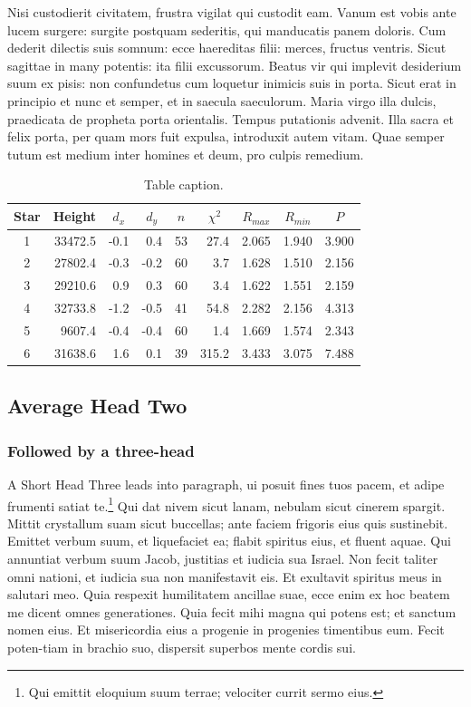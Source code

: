 \documentclass{sili}
\begin{document}
Nisi custodierit civitatem, frustra vigilat qui custodit eam. Vanum
est vobis ante lucem surgere: surgite postquam sederitis, qui
manducatis panem doloris. Cum dederit dilectis suis somnum: ecce
haereditas filii: merces, fructus ventris. Sicut sagittae in many
potentis: ita filii excussorum. Beatus vir qui implevit desiderium
suum ex pisis: non confundetus cum loquetur inimicis suis in porta.
Sicut erat in principio et nunc et semper, et in saecula saeculorum.
Maria virgo illa dulcis, praedicata de propheta porta orientalis.
Tempus putationis advenit.  Illa sacra et felix porta, per quam mors
fuit expulsa, introduxit autem vitam.  Quae semper tutum est medium
inter homines et deum, pro culpis remedium.


\begin{table}
\caption{Table caption.}\label{tbl-2}
\begin{tabular*}{\textwidth}{@{\extracolsep{\fill}}crrrrrrrr@{}}
\hline
Star & Height & \multicolumn{1}{c}{$d_{x}$} &
\multicolumn{1}{c}{$d_{y}$} &
\multicolumn{1}{c}{$n$} &
\multicolumn{1}{c}{$\chi^2$} &
\multicolumn{1}{c}{$R_{max}$} &
\multicolumn{1}{c}{$R_{min}$} &
\multicolumn{1}{c}{$P$}  \\
\hline
1 &33472.5 &-0.1 &0.4  &53 &27.4  &2.065  &1.940 &3.900\\
2 &27802.4 &-0.3 &-0.2 &60 &3.7   &1.628  &1.510 &2.156\\
3 &29210.6 &0.9  &0.3  &60 &3.4   &1.622  &1.551 &2.159\\
4 &32733.8 &-1.2 &-0.5 &41 &54.8  &2.282  &2.156 &4.313\\
5 & 9607.4 &-0.4 &-0.4 &60 &1.4   &1.669  &1.574 &2.343\\
6 &31638.6 &1.6  &0.1  &39 &315.2 & 3.433 &3.075 &7.488\\
\hline
\end{tabular*}
\end{table}


\subsection{Average Head Two}

\subsubsection{Followed by a three-head}

A Short Head Three leads into paragraph, ui posuit fines tuos pacem,
et adipe frumenti satiat te.\footnote{Qui emittit eloquium suum terrae;
velociter currit sermo eius.} Qui dat nivem sicut lanam, nebulam
sicut cinerem spargit. Mittit crystallum suam sicut buccellas; ante
faciem frigoris eius quis sustinebit. Emittet verbum suum, et
liquefaciet ea; flabit spiritus eius, et fluent aquae. Qui annuntiat
verbum suum Jacob, justitias et iudicia sua Israel. Non fecit taliter omni
nationi, et iudicia sua non manifestavit eis. Et exultavit spiritus meus
in salutari meo.  Quia respexit humilitatem ancillae suae, ecce enim ex
hoc beatem me dicent omnes generationes. Quia fecit mihi magna qui potens
est; et sanctum nomen eius. Et misericordia eius a progenie in progenies
timentibus eum. Fecit poten-tiam in brachio suo, dispersit superbos mente
cordis sui.
\end{document}
